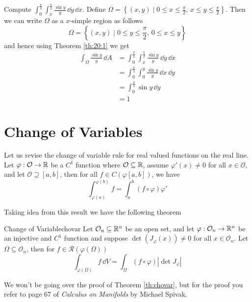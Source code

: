 \documentclass[../Analysis-3.tex]{subfiles}
\begin{document}
\begin{Eg}{}{}
  Compute $\displaystyle{ \int_0^{\frac{\pi}{2}} \int_x^{\frac{\pi}{2}}} \frac{\sin y}{y} \, \dd y \, \dd x$. Define $\Omega = \left\{ (x,y) \mid 0 \leq x \leq \frac{\pi}{2}, \, x \leq y \leq \frac{\pi}{2} \right\}$. Then we can write $\Omega$ as a $x$-simple region as follows
  \[
    \Omega = \left\{ (x,y) \mid 0 \leq y \leq \frac{\pi}{2}, \, 0 \leq x \leq y \right\}
  \]
  and hence using Theorem \ref{th:20:1} we get
  \begin{align*}
    \int_{\Omega} \frac{\sin y}{y} \, \dd A
     & = \int_{0}^{\frac{\pi}{2}} \int_x^{\frac{\pi}{2}} \frac{\sin y}{y} \, \dd y \, \dd x \\
     & = \int_0^{\frac{\pi}{2}} \int_0^y \frac{\sin y}{y} \, \dd x \, \dd y                 \\
     & = \int_0^{\frac{\pi}{2}} \sin y \, \dd y                                             \\
     & = 1
  \end{align*}
\end{Eg}

\section{Change of Variables}

Let us revise the change of variable rule for real valued functions on the real line. Let $\varphi : \mathcal{O} \to \mathbb{R}$ be a $C^1$ function where $\mathcal{O} \subseteq \mathbb{R}$, assume $\varphi'(x) \neq 0$ for all $x \in \mathcal{O}$, and let $\mathcal{O} \supseteq [a,b]$, then for all $f \in C(\varphi[a,b])$, we have
\[
  \int_{\varphi(a)}^{\varphi(b)} f = \int_a^b (f \circ \varphi) \varphi'
\]

Taking idea from this result we have the following theorem

\begin{Thm}{Change of Variable}{chovar}
  Let $\mathcal{O}_n \subseteq \mathbb{R}^n$ be an open set, and let $\varphi : \mathcal{O}_n \to \mathbb{R}^n$ be an injective and $C^1$ function and suppose $\det(J_{\varphi}(x)) \neq 0$ for all $x \in \mathcal{O}_n$. Let $\Omega \subseteq \mathcal{O}_n$, then for $f \in \mathscr{R}(\varphi(\Omega))$
  \[
    \int_{\varphi(\Omega)} f \, \dd V = \int_{\Omega} (f \circ \varphi) |\det J_{\varphi}|
  \]
\end{Thm}
We won't be going over the proof of Theorem \ref{th:chovar}, but for the proof you refer to page 67 of \textit{Calculus on Manifolds} by Michael Spivak.
\end{document}
